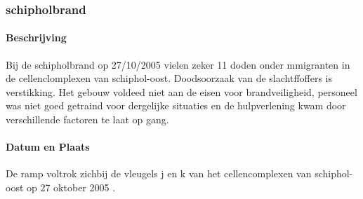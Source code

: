 \documentclass{article}
\begin{document}
	\subsubsection{schipholbrand}
	\paragraph{Beschrijving}
	Bij de schipholbrand op 27/10/2005 vielen zeker 11 doden onder mmigranten in de cellenclomplexen van schiphol-oost. Doodsoorzaak van de slachtffoffers is verstikking. Het gebouw voldeed niet aan de eisen voor brandveiligheid, personeel was niet goed getraind voor dergelijke situaties en de hulpverlening kwam door verschillende factoren te laat op gang.
	\paragraph{Datum en Plaats}
	De ramp voltrok zichbij de vleugels j en k  van het cellencomplexen van schiphol-oost op 27 oktober 2005  . 
\end{document}
